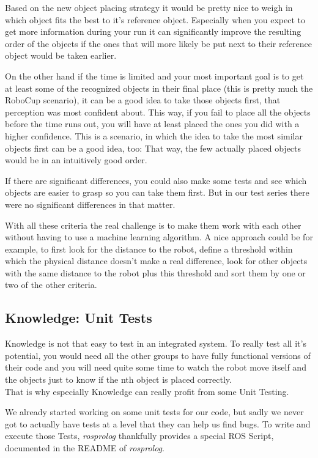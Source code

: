 \documentclass[main.tex]{subfiles}
\begin{document}
	  	Based on the new object placing strategy it would be pretty nice to weigh in which object fits the best to it's reference object. Especially when you expect to get more information during your run it can significantly improve the resulting order of the objects if the ones that will more likely be put next to their reference object would be taken earlier.
	  	
		On the other hand if the time is limited and your most important goal is to get at least some of the recognized objects in their final place (this is pretty much the RoboCup scenario), it can be a good idea to take those objects first, that perception was most confident about. This way, if you fail to place all the objects before the time runs out, you will have at least placed the ones you did with a higher confidence. This is a scenario, in which the idea to take the most similar objects first can be a good idea, too: That way, the few actually placed objects would be in an intuitively good order.
		
		If there are significant differences, you could also make some tests and see which objects are easier to grasp so you can take them first. But in our test series there were no significant differences in that matter. 
		
		With all these criteria the real challenge is to make them work with each other without having to use a machine learning algorithm. A nice approach could be for example, to first look for the distance to the robot, define a threshold within which the physical distance doesn't make a real difference, look for other objects with the same distance to the robot plus this threshold and sort them by one or two of the other criteria. 
		
		\subsection{Knowledge: Unit Tests}
		Knowledge is not that easy to test in an integrated system. To really test all it's potential, you would need all the other groups to have fully functional versions of their code and you will need quite some time to watch the robot move itself and the objects just to know if the nth object is placed correctly.\\
		That is why especially Knowledge can really profit from some Unit Testing.
		
		We already started working on some unit tests for our code, but sadly we never got to actually have tests at a level that they can help us find bugs. To write and execute those Tests, \textit{rosprolog} thankfully provides a special ROS Script, documented in the README of \textit{rosprolog}.
\end{document}
